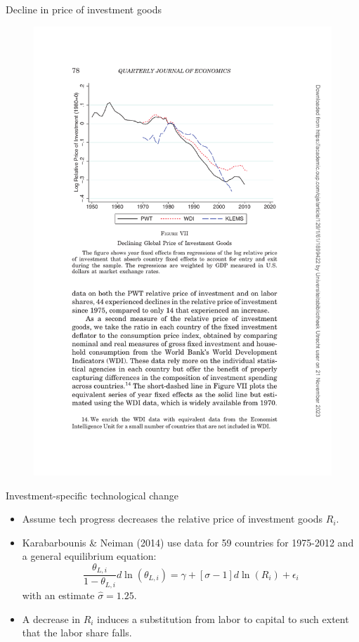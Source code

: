 \documentclass[notes=show]{beamer}
\begin{document}
\begin{frame}{Decline in price of investment goods}
\begin{figure}[p!]
 \includegraphics[width=.8\textwidth]{figure-KN-7.pdf} 
\end{figure}
\end{frame}

\begin{frame}{Investment-specific technological change}
\begin{itemize}
\item Assume tech progress decreases the relative price of investment goods $R_{i}$. \medskip
\item Karabarbounis \& Neiman (2014) use data for 59 countries for 1975-2012 and a general equilibrium equation:
\begin{equation*}
    \frac{\theta_{L,i}}{1 - \theta_{L,i}} d \ln(\theta_{L,i}) = \gamma + [\sigma - 1] d \ln(R_{i}) + \epsilon_{i} \tag{KN-19}
\end{equation*}
with an estimate $\hat{\sigma} = 1.25$. \medskip
\item A decrease in $R_{i}$ induces a substitution from labor to capital to such extent that the labor share falls.
\end{itemize}
\end{frame}
\end{document}
